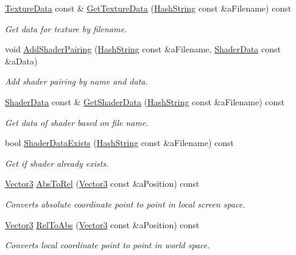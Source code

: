 \begin{DoxyCompactItemize}
\hyperlink{structTextureData}{Texture\+Data} const \& \hyperlink{classGraphicsManager_adb4d6fcd8639d9c6f5ae4838d2539b7f}{Get\+Texture\+Data} (\hyperlink{classHashString}{Hash\+String} const \&a\+Filename) const 
\begin{DoxyCompactList}\small\item\em Get data for texture by filename. \end{DoxyCompactList}\item 
void \hyperlink{classGraphicsManager_a340b71d1dc6fc096ad3f1de53de69e51}{Add\+Shader\+Pairing} (\hyperlink{classHashString}{Hash\+String} const \&a\+Filename, \hyperlink{structShaderData}{Shader\+Data} const \&a\+Data)
\begin{DoxyCompactList}\small\item\em Add shader pairing by name and data. \end{DoxyCompactList}\item 
\hyperlink{structShaderData}{Shader\+Data} const \& \hyperlink{classGraphicsManager_a1a8d331ed157a4f639ff78952e9c98cd}{Get\+Shader\+Data} (\hyperlink{classHashString}{Hash\+String} const \&a\+Filename) const 
\begin{DoxyCompactList}\small\item\em Get data of shader based on file name. \end{DoxyCompactList}\item 
bool \hyperlink{classGraphicsManager_a8ef4477bf860eb1eff8b47a3080a151e}{Shader\+Data\+Exists} (\hyperlink{classHashString}{Hash\+String} const \&a\+Filename) const 
\begin{DoxyCompactList}\small\item\em Get if shader already exists. \end{DoxyCompactList}\item 
\hyperlink{structVector3}{Vector3} \hyperlink{classGraphicsManager_a6f672f82f52f090636599591b309b0eb}{Abs\+To\+Rel} (\hyperlink{structVector3}{Vector3} const \&a\+Position) const 
\begin{DoxyCompactList}\small\item\em Converts absolute coordinate point to point in local screen space. \end{DoxyCompactList}\item 
\hyperlink{structVector3}{Vector3} \hyperlink{classGraphicsManager_a83e27a43d563d47fb22a52cf842a6b9b}{Rel\+To\+Abs} (\hyperlink{structVector3}{Vector3} const \&a\+Position) const 
\begin{DoxyCompactList}\small\item\em Converts local coordinate point to point in world space. \end{DoxyCompactList}\end{DoxyCompactItemize}
